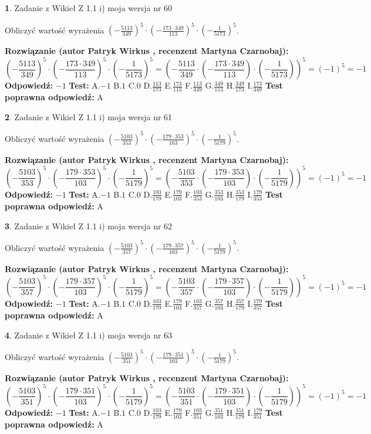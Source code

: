 \documentclass[12pt, a4paper]{article}
\theoremstyle{definition} %
\newtheorem{zad}{}
\newcommand{\zadStart}[1]{\begin{zad}#1\newline}
\newcommand{\zadStop}{\end{zad}}
\newcommand{\rozwStart}[2]{\noindent \textbf{Rozwiązanie (autor #1 , recenzent #2): }\newline}
\newcommand{\rozwStop}{\newline}
\newcommand{\odpStart}{\noindent \textbf{Odpowiedź:}\newline}
\newcommand{\odpStop}{\newline}
\newcommand{\testStart}{\noindent \textbf{Test:}\newline}
\newcommand{\testStop}{\newline}
\newcommand{\kluczStart}{\noindent \textbf{Test poprawna odpowiedź:}\newline}
\newcommand{\kluczStop}{\newline}
\begin{document}
\zadStart{Zadanie z Wikieł Z 1.1 i) moja wersja nr 60}

Obliczyć wartość wyrażenia $(-\frac{5113}{349})^{5} \cdot (-\frac{173 \cdot 349}{113})^{5} \cdot (-\frac{1}{5173})^{5}$.
\zadStop
\rozwStart{Patryk Wirkus}{Martyna Czarnobaj}
$$(-\frac{5113}{349})^{5} \cdot (-\frac{173 \cdot 349}{113})^{5} \cdot (-\frac{1}{5173})^{5} = (-\frac{5113}{349} \cdot (-\frac{173 \cdot 349}{113}) \cdot (-\frac{1}{5173}))^{5} = (-1)^{5} = -1$$
\rozwStop
\odpStart
$-1$
\odpStop
\testStart
A.$-1$ B.$1$ C.$0$ D.$\frac{113}{173}$ E.$\frac{173}{113}$
F.$\frac{113}{349}$ G.$\frac{349}{113}$
H.$\frac{349}{173}$
I.$\frac{173}{349}$
\testStop
\kluczStart
A
\kluczStop



\zadStart{Zadanie z Wikieł Z 1.1 i) moja wersja nr 61}

Obliczyć wartość wyrażenia $(-\frac{5103}{353})^{5} \cdot (-\frac{179 \cdot 353}{103})^{5} \cdot (-\frac{1}{5179})^{5}$.
\zadStop
\rozwStart{Patryk Wirkus}{Martyna Czarnobaj}
$$(-\frac{5103}{353})^{5} \cdot (-\frac{179 \cdot 353}{103})^{5} \cdot (-\frac{1}{5179})^{5} = (-\frac{5103}{353} \cdot (-\frac{179 \cdot 353}{103}) \cdot (-\frac{1}{5179}))^{5} = (-1)^{5} = -1$$
\rozwStop
\odpStart
$-1$
\odpStop
\testStart
A.$-1$ B.$1$ C.$0$ D.$\frac{103}{179}$ E.$\frac{179}{103}$
F.$\frac{103}{353}$ G.$\frac{353}{103}$
H.$\frac{353}{179}$
I.$\frac{179}{353}$
\testStop
\kluczStart
A
\kluczStop



\zadStart{Zadanie z Wikieł Z 1.1 i) moja wersja nr 62}

Obliczyć wartość wyrażenia $(-\frac{5103}{357})^{5} \cdot (-\frac{179 \cdot 357}{103})^{5} \cdot (-\frac{1}{5179})^{5}$.
\zadStop
\rozwStart{Patryk Wirkus}{Martyna Czarnobaj}
$$(-\frac{5103}{357})^{5} \cdot (-\frac{179 \cdot 357}{103})^{5} \cdot (-\frac{1}{5179})^{5} = (-\frac{5103}{357} \cdot (-\frac{179 \cdot 357}{103}) \cdot (-\frac{1}{5179}))^{5} = (-1)^{5} = -1$$
\rozwStop
\odpStart
$-1$
\odpStop
\testStart
A.$-1$ B.$1$ C.$0$ D.$\frac{103}{179}$ E.$\frac{179}{103}$
F.$\frac{103}{357}$ G.$\frac{357}{103}$
H.$\frac{357}{179}$
I.$\frac{179}{357}$
\testStop
\kluczStart
A
\kluczStop



\zadStart{Zadanie z Wikieł Z 1.1 i) moja wersja nr 63}

Obliczyć wartość wyrażenia $(-\frac{5103}{351})^{5} \cdot (-\frac{179 \cdot 351}{103})^{5} \cdot (-\frac{1}{5179})^{5}$.
\zadStop
\rozwStart{Patryk Wirkus}{Martyna Czarnobaj}
$$(-\frac{5103}{351})^{5} \cdot (-\frac{179 \cdot 351}{103})^{5} \cdot (-\frac{1}{5179})^{5} = (-\frac{5103}{351} \cdot (-\frac{179 \cdot 351}{103}) \cdot (-\frac{1}{5179}))^{5} = (-1)^{5} = -1$$
\rozwStop
\odpStart
$-1$
\odpStop
\testStart
A.$-1$ B.$1$ C.$0$ D.$\frac{103}{179}$ E.$\frac{179}{103}$
F.$\frac{103}{351}$ G.$\frac{351}{103}$
H.$\frac{351}{179}$
I.$\frac{179}{351}$
\testStop
\kluczStart
A
\kluczStop
\end{document}
